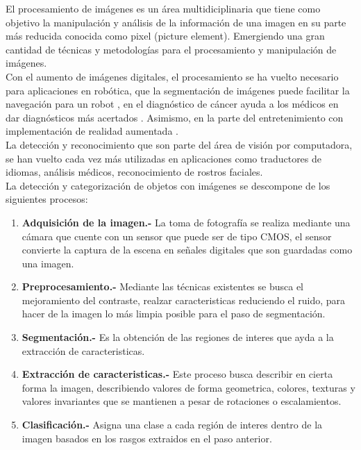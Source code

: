 \documentclass[a4paper, 11pt]{article}
\begin{document}
El procesamiento de imágenes es un área multidiciplinaria que tiene como objetivo la manipulación y análisis de la información de una imagen en su parte más reducida conocida como pixel (picture element). Emergiendo una gran cantidad de técnicas y metodologías para el procesamiento y manipulación de imágenes.\\

Con el aumento de imágenes digitales, el procesamiento se ha vuelto necesario para aplicaciones en robótica, que la segmentación de imágenes puede facilitar la navegación para un robot \cite{smolyanskiy2017lowflying}, en el diagnóstico de cáncer ayuda a los médicos en dar diagnósticos más acertados \cite{10059977}. Asimismo, en la parte del entretenimiento con implementación de realidad aumentada \cite{8776989} .\\

La detección y reconocimiento que son parte del área de visión por computadora, se han vuelto cada vez más utilizadas en aplicaciones como traductores de idiomas, análisis médicos, reconocimiento de rostros faciales.\\

La detección y categorización de objetos con imágenes se descompone de los siguientes procesos:

\begin{enumerate}
\item \textbf{Adquisición de la imagen.-} La toma de fotografía se realiza mediante una cámara  que cuente con un sensor que puede ser de tipo CMOS, el sensor convierte la captura de la escena en señales digitales que son guardadas como una imagen.
\item \textbf{Preprocesamiento.-} Mediante las técnicas existentes se busca el mejoramiento del contraste, realzar caracteristicas reduciendo el ruido, para hacer de la imagen lo más limpia posible para el paso de segmentación. 
\item \textbf{Segmentación.-} Es la obtención de las regiones de interes que ayda a la extracción de caracteristicas.
\item \textbf{Extracción de caracteristicas.-} Este proceso busca describir en cierta forma la imagen, describiendo valores de forma geometrica, colores, texturas y valores invariantes que se mantienen a pesar de rotaciones o escalamientos.
\item \textbf{Clasificación.-} Asigna una clase a cada región de interes dentro de la imagen basados en los rasgos extraidos en el paso anterior.
\end{enumerate}
\end{document}

